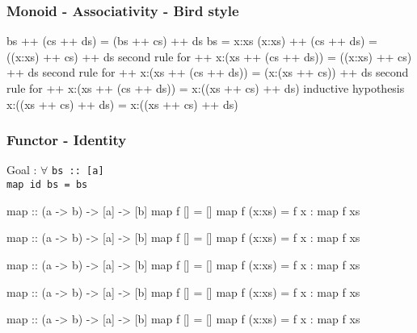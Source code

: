 \documentclass{beamer}
\newcommand{\ca}[1]{{\color{blue}#1}}
\newcommand{\cb}[1]{{\color{violet}#1}}
\newcommand{\cc}[1]{{\color{red}#1}}
\newcommand{\ce}[1]{{\color{green!50!black}#1}}
\begin{document}
\begin{frame}[fragile]
    \frametitle {Monoid - Associativity - Bird style}
\begin{semiverbatim}
    bs ++ (cs ++ ds) = (bs ++ cs) ++ ds
                  \ce{bs = x:xs}
(x:xs) ++ (cs ++ ds) = ((x:xs) ++ cs) ++ ds
              \ce{second rule for ++}
x:(xs ++ (cs ++ ds)) = ((x:xs) ++ cs) ++ ds
              \ce{second rule for ++}
x:(xs ++ (cs ++ ds)) = (x:(xs ++ cs)) ++ ds
              \ce{second rule for ++}
x:(xs ++ (cs ++ ds)) = x:((xs ++ cs) ++ ds)
             \ce{inductive hypothesis}
x:((xs ++ cs) ++ ds) = x:((xs ++ cs) ++ ds)
\end{semiverbatim}
\end{frame}

\begin{frame}[t,fragile]
    \frametitle {Functor - Identity}

\begingroup
\color{gray}\fontsize{10}{9.8}\selectfont

Goal : $\forall$ \verb?bs :: [a]? \\
    \quad \alert<3,13>{\Verb?map id bs = bs?}

\vspace{10pt}

\begin{overprint}

\begin{semiverbatim}
map :: (a -> b) -> [a] -> [b]
map f [] = []
map f (x:xs) = f x : map f xs
\end{semiverbatim}

\begin{semiverbatim}
map :: (a -> b) -> [a] -> [b]
map \ca{f} \cb{[]} = []
map f (x:xs) = f x : map f xs
\end{semiverbatim}

\begin{semiverbatim}
map :: (a -> b) -> [a] -> [b]
map \ca{f} \cb{[]} = \cb{[]}
map f (x:xs) = f x : map f xs
\end{semiverbatim}

\begin{semiverbatim}
map :: (a -> b) -> [a] -> [b]
map f [] = []
map \ca{f} (\cb{x}:\cc{xs}) = f x : map f xs
\end{semiverbatim}

\begin{semiverbatim}
map :: (a -> b) -> [a] -> [b]
map f [] = []
map \ca{f} (\cb{x}:\cc{xs}) = \ca{f} \cb{x} : map \ca{f} \cc{xs}
\end{semiverbatim}


\end{overprint}
\end{frame}
\end{document}
